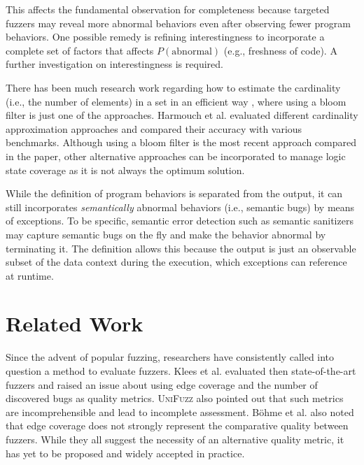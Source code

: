 \documentclass[letterpaper,twocolumn,10pt]{article}
\begin{document}
This affects the fundamental observation for completeness because targeted
fuzzers may reveal more abnormal behaviors even after observing fewer program
behaviors.
%
One possible remedy is refining interestingness to incorporate a complete set of
factors that affects $P(\mathrm{abnormal})$ (e.g., freshness of code).  A
further investigation on interestingness is required.


%
There has been much research work regarding how to estimate the cardinality
(i.e., the number of elements) in a set in an efficient way
\cite{papapetrou2010cardinality,harmouch2017cardinality}, where using a bloom
filter is just one of the approaches. Harmouch et al.
\cite{harmouch2017cardinality} evaluated different cardinality approximation
approaches and compared their accuracy with various benchmarks.  Although using
a bloom filter is the most recent approach compared in the paper, other
alternative approaches can be incorporated to manage logic state coverage as it
is not always the optimum solution.


%
While the definition of program behaviors is separated from the output, it can
still incorporates \emph{semantically} abnormal behaviors (i.e., semantic bugs)
by means of exceptions. To be specific, semantic error detection such as
semantic sanitizers \cite{kim2019hydra,yun2016apisan} may capture semantic bugs
on the fly and make the behavior abnormal by terminating it. The definition
allows this because the output is just an observable subset of the data context
during the execution, which exceptions can reference at runtime.


\section{Related Work}

%
Since the advent of popular fuzzing, researchers have consistently
called into question a method to evaluate fuzzers. Klees et al.
\cite{klees2018evaluating} evaluated then state-of-the-art fuzzers and raised an
issue about using edge coverage and the number of discovered bugs as quality
metrics. \textsc{UniFuzz} \cite{li2021unifuzz} also pointed out that such
metrics are incomprehensible and lead to incomplete assessment. B\"{o}hme et al.
\cite{bohme2022reliability} also noted that edge coverage does not strongly
represent the comparative quality between fuzzers.  While they all suggest the
necessity of an alternative quality metric, it has yet to be proposed and widely
accepted in practice. 
\end{document}
